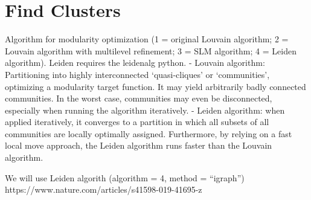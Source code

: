 \documentclass[
  letterpaper,
  DIV=11,
  numbers=noendperiod]{scrreprt}
\begin{document}
\section{Find Clusters}\label{find-clusters}

Algorithm for modularity optimization (1 = original Louvain algorithm; 2
= Louvain algorithm with multilevel refinement; 3 = SLM algorithm; 4 =
Leiden algorithm). Leiden requires the leidenalg python. - Louvain
algorithm: Partitioning into highly interconnected `quasi-cliques' or
`communities', optimizing a modularity target function. It may yield
arbitrarily badly connected communities. In the worst case, communities
may even be disconnected, especially when running the algorithm
iteratively. - Leiden algorithm: when applied iteratively, it converges
to a partition in which all subsets of all communities are locally
optimally assigned. Furthermore, by relying on a fast local move
approach, the Leiden algorithm runs faster than the Louvain algorithm.

We will use Leiden algorith (algorithm = 4, method = ``igraph'')
https://www.nature.com/articles/s41598-019-41695-z
\end{document}
